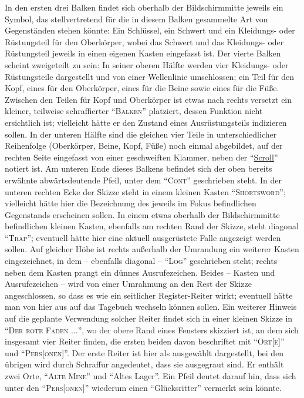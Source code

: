 \documentclass[a5paper,pagesize,numbers=noenddot]{scrbook}
\begin{document}
In den ersten drei Balken findet sich oberhalb der Bildschirmmitte jeweils ein Symbol, das stellvertretend für die in diesem Balken gesammelte Art von Gegenständen stehen könnte:
Ein Schlüssel, ein Schwert und ein Kleidungs- oder Rüstungsteil für den Oberkörper, wobei das Schwert und das Kleidungs- oder Rüstungsteil jeweils in einen eigenen Kasten eingefasst ist.
Der vierte Balken scheint zweigeteilt zu sein:
In seiner oberen Hälfte werden vier Kleidungs- oder Rüstungsteile dargestellt und von einer Wellenlinie umschlossen; ein Teil für den Kopf, eines für den Oberkörper, eines für die Beine sowie eines für die Füße.
Zwischen den Teilen für Kopf und Oberkörper ist etwas nach rechts versetzt ein kleiner, teilweise schraffierter \enquote{\textsc{Balken}} platziert, dessen Funktion nicht ersichtlich ist; vielleicht hätte er den Zustand eines Ausrüstungsteils indizieren sollen. %
In der unteren Hälfte sind die gleichen vier Teile in unterschiedlicher Reihenfolge (Oberkörper, Beine, Kopf, Füße) noch einmal abgebildet, auf der rechten Seite eingefasst von einer geschweiften Klammer, neben der \enquote{\uline{Scroll}} notiert ist.
Am unteren Ende dieses Balkens befindet sich der oben bereits erwähnte abwärtsdeutende Pfeil, unter dem \enquote{\textsc{Cont}} geschrieben steht.
In der unteren rechten Ecke der Skizze steht in einem kleinen Kasten \enquote{\textsc{Shortsword}}; vielleicht hätte hier die Bezeichnung des jeweils im Fokus befindlichen Gegenstands erscheinen sollen. %
In einem etwas oberhalb der Bildschirmmitte befindlichen kleinen Kasten, ebenfalls am rechten Rand der Skizze, steht diagonal \enquote{\textsc{Trap}}; eventuell hätte hier eine aktuell ausgerüstete Falle angezeigt werden sollen. %
Auf gleicher Höhe ist rechts außerhalb der Umrandung ein weiterer Kasten eingezeichnet, in dem -- ebenfalls diagonal -- \enquote{\textsc{Log}} geschrieben steht; rechts neben dem Kasten prangt ein dünnes Ausrufezeichen.\autocite[S.~7]{orpheus_interface}
Beides -- Kasten und Ausrufezeichen -- wird von einer Umrahmung an den Rest der Skizze angeschlossen, so dass es wie ein seitlicher Register-Reiter wirkt; eventuell hätte man von hier aus auf das Tagebuch wechseln können sollen.
Ein weiterer Hinweis auf die geplante Verwendung solcher Reiter findet sich in einer kleinen Skizze in \enquote{\textsc{Der rote Faden $\ldots$}}, wo der obere Rand eines Fensters skizziert ist, an dem sich insgesamt vier Reiter finden, die ersten beiden davon beschriftet mit \enquote{\textsc{Ort[e]}} und \enquote{\textsc{Pers[onen]}}.
Der erste Reiter ist hier als ausgewählt dargestellt, bei den übrigen wird durch Schraffur angedeutet, dass sie ausgegraut sind.
Er enthält zwei Orte, \enquote{\textsc{Alte Mine}} und \enquote{Altes Lager}.
Ein Pfeil deutet darauf hin, dass sich unter den \enquote{\textsc{Pers[onen]}} wiederum einen \enquote{Glücksritter} vermerkt sein könnte.\autocite[S.~2]{orpheus_der_rote}
\end{document}
